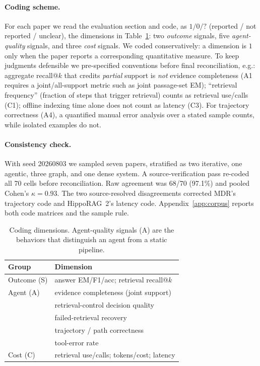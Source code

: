 \documentclass[11pt]{article}
\begin{document}
\paragraph{Coding scheme.} For each paper we read the evaluation section and code, as $1/0/?$ (reported
/ not reported / unclear), the dimensions in Table~\ref{tab:dims}: two \emph{outcome} signals, five
\emph{agent-quality} signals, and three \emph{cost} signals. We coded conservatively: a dimension is
$1$ only when the paper reports a corresponding quantitative measure. To keep judgments defensible we
pre-specified conventions before final reconciliation, e.g.: aggregate recall@$k$ that credits
\emph{partial} support is
\emph{not} evidence completeness (A1 requires a joint/all-support metric such as joint passage-set EM);
``retrieval frequency'' (fraction of steps that trigger retrieval) counts as retrieval use/calls (C1);
offline indexing time alone does not count as latency (C3). For trajectory correctness (A4), a
quantified manual error analysis over a stated sample counts, while isolated examples do not.

\paragraph{Consistency check.} With seed 20260803 we sampled seven papers, stratified as two iterative,
one agentic, three graph, and one dense system. A source-verification pass re-coded all 70 cells before
reconciliation. Raw agreement was 68/70 (97.1\%) and pooled Cohen's $\kappa=0.93$. The two source-resolved
disagreements corrected MDR's trajectory code and HippoRAG~2's latency code.
Appendix~\ref{app:corpus} reports both code matrices and the sample rule.

\begin{table}[t]\centering\footnotesize
\caption{Coding dimensions. Agent-quality signals (A) are the behaviors that distinguish an agent from
a static pipeline.}
\label{tab:dims}
\begin{tabular}{@{}ll@{}}
\toprule
\textbf{Group} & \textbf{Dimension} \\
\midrule
Outcome (S) & answer EM/F1/acc; retrieval recall@$k$ \\
\midrule
Agent (A) & evidence completeness (joint support) \\
 & retrieval-control decision quality \\
 & failed-retrieval recovery \\
 & trajectory / path correctness \\
 & tool-error rate \\
\midrule
Cost (C) & retrieval use/calls; tokens/cost; latency \\
\bottomrule
\end{tabular}
\end{table}
\end{document}
